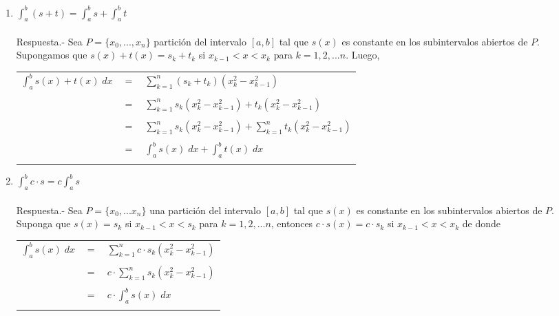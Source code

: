 \begin{enumerate}
\begin{enumerate}[\bfseries (a)]
	\item $\displaystyle\int_{a}^{b} (s+t)=\int_{a}^{b} s + \int_{a}^{b} t$\\\\
	    Respuesta.-\; Sea $P=\lbrace x_0,...,x_n \rbrace$ partición del intervalo $[a,b]$ tal que $s(x)$ es constante en los subintervalos abiertos de $P$. Supongamos que $s(x) + t(x) = s_k + t_k$ si $x_{k-1}<x<x_k$ para $k=1,2,...n$. Luego,
	    \begin{center}
		\begin{tabular}{rcl}
		    $\displaystyle\int_{a}^{b} s(x) + t(x) \; dx$&$=$&$\sum\limits_{k=1}^n (s_k + t_k)(x_k^2 - x_{k-1}^2)$\\\\
		    &$=$&$\sum\limits_{k=1}^{n} s_k(x_k^2 - x_{k-1}^2) + t_k(x_k^2 - x_{k-1}^2)$\\\\
		    &$=$&$\sum\limits_{k=1}^{n} s_k(x_k^2 - x_{k-1}^2) + \sum\limits_{k=1}^{n} t_k(x_k^2 - x_{k-1}^2)$\\\\
		    &$=$&$\displaystyle\int_{a}^{b} s(x) \; dx + \int_{a}^{b} t(x) \; dx$\\\\
		\end{tabular}
	    \end{center}

	\item $\displaystyle\int_{a}^{b} c\cdot s = c\int_{a}^{b} s$\\\\
	    Respuesta.-\; Sea $P=\lbrace x_0,...x_n \rbrace$ una partición del intervalo $[a,b]$ tal que $s(x)$ es constante en los subintervalos  abiertos de $P$. Suponga que $s(x)=s_k$ si $x_{k-1} < x< s_{k}$ para $k=1,2,...n$, entonces $c\cdot s(x) = c\cdot s_k$ si $x_{k-1}<x<x_k$ de donde 
	    \begin{center}
		\begin{tabular}{rcl}
		    $\displaystyle\int_{a}^{b} s(x) \; dx$&$=$&$\sum\limits_{k=1}^{n} c\cdot s_k(x_k^2 - x_{k-1}^2)$\\\\
		    &$=$&$c\cdot \sum\limits_{k=1}^{n} s_k(x_k^2 - x_{k-1}^2)$\\\\
		    &$=$&$c\cdot \displaystyle\int_{a}^{b} s(x) \; dx$\\\\
		\end{tabular}
	    \end{center}


\end{enumerate}
\end{enumerate}
